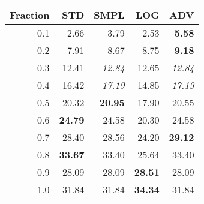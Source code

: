 \documentclass{standalone}
\begin{document}
\begin{tabular}{r|rrrr}
      \toprule
      Fraction & STD & SMPL & LOG & ADV\\
      \midrule
      0.1 & 2.66 & 3.79 & 2.53 & \textbf{5.58}\\
  0.2 & 7.91 & 8.67 & 8.75 & \textbf{9.18}\\
  0.3 & 12.41 & \emph{12.84} & 12.65 & \emph{12.84}\\
  0.4 & 16.42 & \emph{17.19} & 14.85 & \emph{17.19}\\
  0.5 & 20.32 & \textbf{20.95} & 17.90 & 20.55\\
  0.6 & \textbf{24.79} & 24.58 & 20.30 & 24.58\\
  0.7 & 28.40 & 28.56 & 24.20 & \textbf{29.12}\\
  0.8 & \textbf{33.67} & 33.40 & 25.64 & 33.40\\
  0.9 & 28.09 & 28.09 & \textbf{28.51} & 28.09\\
  1.0 & 31.84 & 31.84 & \textbf{34.34} & 31.84\\
  \bottomrule
\end{tabular}
\end{document}
